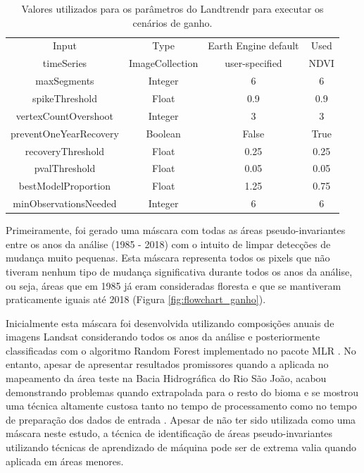 \begin{table}[h!]
    \centering
    \begin{tabular}{| c | c | c | c |}
    \hline
            Input & Type & Earth Engine default & Used \\
            timeSeries & ImageCollection & user-specified & NDVI \\
            maxSegments & Integer & 6 & 6 \\
            spikeThreshold & Float & 0.9 & 0.9 \\
            vertexCountOvershoot & Integer & 3 & 3 \\
            preventOneYearRecovery & Boolean & False & True \\
            recoveryThreshold & Float & 0.25 & 0.25 \\
            pvalThreshold & Float & 0.05 & 0.05 \\
            bestModelProportion & Float & 1.25 & 0.75 \\
            minObservationsNeeded & Integer & 6 & 6 \\
    \hline
    \end{tabular}
    \caption{Valores utilizados para os parâmetros do Landtrendr para executar os cenários de ganho.}
    \label{tab:ltr_gain_params}
\end{table}

Primeiramente, foi gerado uma máscara com todas as áreas pseudo-invariantes entre os anos da análise (1985 - 2018) com o intuito de limpar detecções de mudança muito pequenas. Esta máscara representa todos os pixels que não tiveram nenhum tipo de mudança significativa durante todos os anos da análise, ou seja, áreas que em 1985 já eram consideradas floresta e que se mantiveram praticamente iguais até 2018 (Figura \ref{fig:flowchart_ganho}). 

Inicialmente esta máscara foi desenvolvida utilizando composições anuais de imagens Landsat considerando todos os anos da análise e posteriormente classificadas com o algoritmo Random Forest implementado no pacote MLR \citep{mlr}. No entanto, apesar de apresentar resultados promissores quando a aplicada no mapeamento da área teste na Bacia Hidrográfica do Rio São João, acabou demonstrando problemas quando extrapolada para o resto do bioma e se mostrou uma técnica altamente custosa tanto no tempo de processamento como no tempo de preparação dos dados de entrada \citep{LACERDA2021}. Apesar de não ter sido utilizada como uma máscara neste estudo, a técnica de identificação de áreas pseudo-invariantes utilizando técnicas de aprendizado de máquina pode ser de extrema valia quando aplicada em áreas menores.

